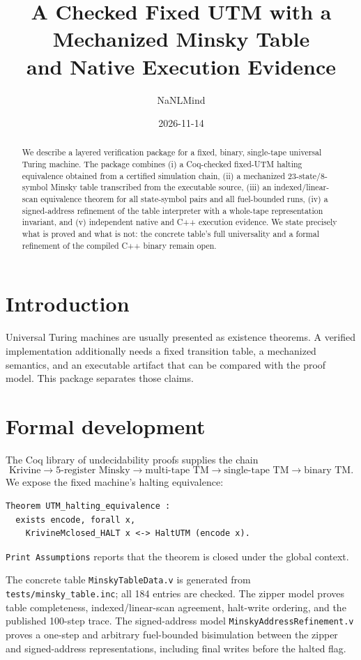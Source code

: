 \documentclass[11pt]{article}
\title{A Checked Fixed UTM with a Mechanized Minsky Table\\and Native Execution Evidence}
\author{NaNLMind}
\date{2026-11-14}
\begin{document}
\maketitle

\begin{abstract}
We describe a layered verification package for a fixed, binary, single-tape
universal Turing machine.  The package combines (i) a Coq-checked fixed-UTM
halting equivalence obtained from a certified simulation chain, (ii) a
mechanized 23-state/8-symbol Minsky table transcribed from the executable
source, (iii) an indexed/linear-scan equivalence theorem for all state-symbol
pairs and all fuel-bounded runs, (iv) a signed-address refinement of the table
interpreter with a whole-tape representation invariant, and (v) independent
native and C++ execution evidence.  We state precisely what is proved and what
is not: the concrete table's full universality and a formal refinement of the
compiled C++ binary remain open.
\end{abstract}

\section{Introduction}
Universal Turing machines are usually presented as existence theorems.  A
verified implementation additionally needs a fixed transition table, a
mechanized semantics, and an executable artifact that can be compared with the
proof model.  This package separates those claims.

\section{Formal development}
The Coq library of undecidability proofs supplies the chain
\[
\text{Krivine} \to \text{5-register Minsky} \to \text{multi-tape TM}
\to \text{single-tape TM} \to \text{binary TM}.
\]
We expose the fixed machine's halting equivalence:
\begin{verbatim}
Theorem UTM_halting_equivalence :
  exists encode, forall x,
    KrivineMclosed_HALT x <-> HaltUTM (encode x).
\end{verbatim}
\texttt{Print Assumptions} reports that the theorem is closed under the global
context.

The concrete table \texttt{MinskyTableData.v} is generated from
\texttt{tests/minsky\_table.inc}; all 184 entries are checked.  The zipper
model proves table completeness, indexed/linear-scan agreement, halt-write
ordering, and the published 100-step trace.  The signed-address model
\texttt{MinskyAddressRefinement.v} proves a one-step and arbitrary
fuel-bounded bisimulation between the zipper and signed-address
representations, including final writes before the halted flag.
\end{document}
